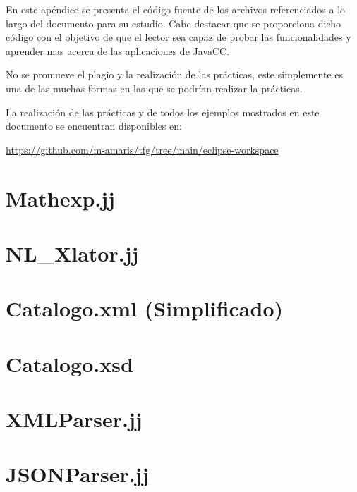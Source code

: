
En este apéndice se presenta el código fuente de los archivos referenciados a lo largo del documento para su estudio. Cabe destacar que se proporciona dicho código con el objetivo de que el lector sea capaz de probar las funcionalidades y aprender mas acerca de las aplicaciones de JavaCC.

No se promueve el plagio y la realización de las prácticas, este simplemente es una de las muchas formas en las que se podrían realizar la prácticas.

La realización de las prácticas y de todos los ejemplos mostrados en este documento se encuentran disponibles en:

\href{https://github.com/m-amaris/tfg/tree/main/eclipse-workspace}{https://github.com/m-amaris/tfg/tree/main/eclipse-workspace}

\pagestyle{empty}


\section{Mathexp.jj}
\label{sec:mathexp}
\lstset{inputencoding=utf8/latin1}


\newpage
\section{NL\_Xlator.jj}
\label{sec:nlxlator}
\lstset{inputencoding=utf8/latin1}


\newpage
\section{Catalogo.xml (Simplificado)}
\label{sec:catalogoxml}
\lstset{inputencoding=utf8/latin1}


\newpage
\section{Catalogo.xsd }
\label{sec:catalogoxsd}
\lstset{inputencoding=utf8/latin1}


\newpage
\section{XMLParser.jj}
\label{sec:XMLParser}
\lstset{inputencoding=utf8/latin1}


\newpage
\section{JSONParser.jj}
\label{sec:JSONParser}
\lstset{inputencoding=utf8/latin1}


\restoregeometry